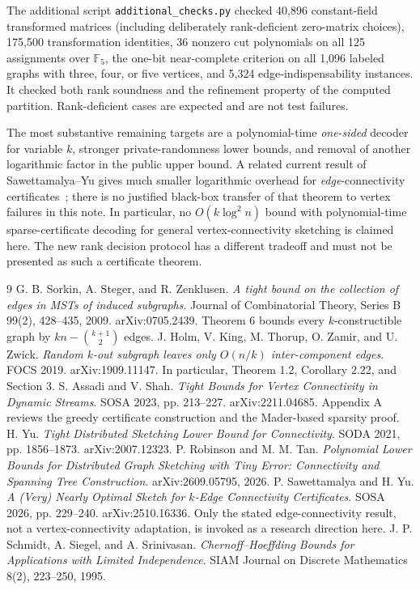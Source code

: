 \documentclass[11pt]{article}
\theoremstyle{remark}\newtheorem{remark}[theorem]{Remark}
\newcommand{\F}{\mathbb F}
\begin{document}
The additional script \texttt{additional\_checks.py} checked 40,896 constant-field transformed matrices (including deliberately rank-deficient zero-matrix choices), 175,500 transformation identities, 36 nonzero cut polynomials on all 125 assignments over $\F_5$, the one-bit near-complete criterion on all 1,096 labeled graphs with three, four, or five vertices, and 5,324 edge-indispensability instances. It checked both rank soundness and the refinement property of the computed partition. Rank-deficient cases are expected and are not test failures.

The most substantive remaining targets are a polynomial-time \emph{one-sided} decoder for variable $k$, stronger private-randomness lower bounds, and removal of another logarithmic factor in the public upper bound. A related current result of Sawettamalya--Yu gives much smaller logarithmic overhead for \emph{edge}-connectivity certificates~\cite{SY26}; there is no justified black-box transfer of that theorem to vertex failures in this note. In particular, no $O(k\log^2n)$ bound with polynomial-time sparse-certificate decoding for general vertex-connectivity sketching is claimed here. The new rank decision protocol has a different tradeoff and must not be presented as such a certificate theorem.

\begin{thebibliography}{9}
 G. B. Sorkin, A. Steger, and R. Zenklusen. \emph{A tight bound on the collection of edges in MSTs of induced subgraphs}. Journal of Combinatorial Theory, Series B 99(2), 428--435, 2009. arXiv:0705.2439. Theorem 6 bounds every $k$-constructible graph by $kn-\binom{k+1}{2}$ edges.
 J. Holm, V. King, M. Thorup, O. Zamir, and U. Zwick. \emph{Random $k$-out subgraph leaves only $O(n/k)$ inter-component edges}. FOCS 2019. arXiv:1909.11147. In particular, Theorem 1.2, Corollary 2.22, and Section 3.
 S. Assadi and V. Shah. \emph{Tight Bounds for Vertex Connectivity in Dynamic Streams}. SOSA 2023, pp. 213--227. arXiv:2211.04685. Appendix A reviews the greedy certificate construction and the Mader-based sparsity proof.
 H. Yu. \emph{Tight Distributed Sketching Lower Bound for Connectivity}. SODA 2021, pp. 1856--1873. arXiv:2007.12323.
 P. Robinson and M. M. Tan. \emph{Polynomial Lower Bounds for Distributed Graph Sketching with Tiny Error: Connectivity and Spanning Tree Construction}. arXiv:2609.05795, 2026.
 P. Sawettamalya and H. Yu. \emph{A (Very) Nearly Optimal Sketch for $k$-Edge Connectivity Certificates}. SOSA 2026, pp. 229--240. arXiv:2510.16336. Only the stated edge-connectivity result, not a vertex-connectivity adaptation, is invoked as a research direction here.
 J. P. Schmidt, A. Siegel, and A. Srinivasan. \emph{Chernoff--Hoeffding Bounds for Applications with Limited Independence}. SIAM Journal on Discrete Mathematics 8(2), 223--250, 1995.
\end{thebibliography}
\end{document}
